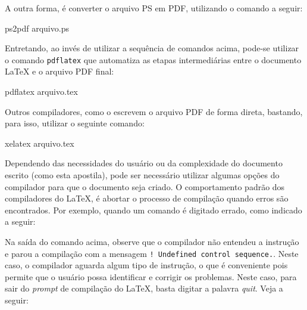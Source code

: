 A outra forma, é converter o arquivo PS em PDF, utilizando o comando a seguir:

\begin{meucomando}
ps2pdf arquivo.ps 
\end{meucomando}

Entretando, ao invés de utilizar a sequência de comandos acima, pode-se utilizar o comando {\tt pdflatex} que automatiza as etapas intermediárias entre o documento \LaTeX{} e o arquivo PDF final:

\begin{meucomando}
pdflatex arquivo.tex
\end{meucomando}

Outros compiladores, como o \XeLaTeX{} escrevem o arquivo PDF de forma direta, bastando, para isso, utilizar o seguinte comando:

\begin{meucomando}
xelatex arquivo.tex
\end{meucomando}

Dependendo das necessidades do usuário ou da complexidade do documento escrito (como esta apostila), pode ser necessário utilizar algumas opções do compilador para que o documento seja criado. O comportamento padrão dos compiladores do \LaTeX{}, é abortar o processo de compilação quando erros são encontrados. Por exemplo, quando um comando é digitado errado, como indicado a seguir:


Na saída do comando acima, observe que o compilador não entendeu a instrução \texttt{\maketitlee} e parou a compilação com a mensagem {\tt ! Undefined control sequence.}. Neste caso, o compilador aguarda algum tipo de instrução, o que é conveniente pois permite que o usuário possa identificar e corrigir os problemas. Neste caso, para sair do \textit{prompt} de compilação do \LaTeX{}, basta digitar a palavra \textit{quit}. Veja a seguir:

